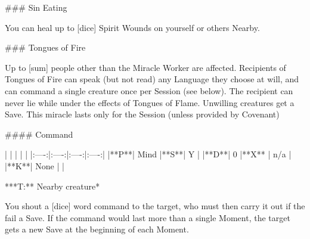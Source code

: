 ### Sin Eating

You can heal up to [dice] Spirit Wounds on yourself or others Nearby.



### Tongues of Fire

Up to [sum] people other than the Miracle Worker are affected.  Recipients of Tongues of Fire can speak (but not read) any Language they choose at will, and can command a single creature once per Session (see below).  The recipient can never lie while under the effects of Tongues of Flame.  Unwilling creatures get a Save.  This miracle lasts only for the Session (unless provided by Covenant)



#### Command

| | | | |
|:----:|:----:|:----:|:----:|
|**P**| Mind |**S**|  Y |
|**D**| 0 |**X** |  n/a  |
|**K**| None | |


***T:**  Nearby creature*



You shout a [dice] word command to the target, who must then carry it out if the fail a Save.  If the command would last more than a single Moment, the target gets a new Save at the beginning of each Moment.




